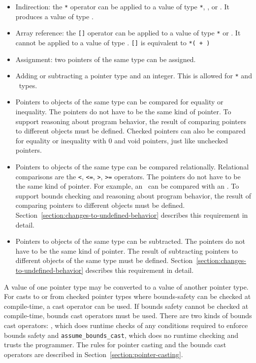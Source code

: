\begin{itemize}
\item
  Indirection: the \texttt{*} operator can be applied to a value of type
   \texttt{*}, \ptrT, or \arrayptrT. It produces a value of type .
\item
  Array reference: the \texttt{[]} operator can be applied to a
  value of type  \texttt{*} or \arrayptrT. It
  cannot be applied to a value of type \ptrT.
  \texttt{[]} is equivalent to
  \texttt{*( + )}
\item
  Assignment: two pointers of the same type can be assigned.
\item
  Adding or subtracting a pointer type and an integer. This is allowed
  for  \texttt{*} and \arrayptrT\ types.
\item
  Pointers to objects of the same type can be compared for equality or
  inequality. The pointers do not have to be the same kind of pointer.
  To support reasoning about program behavior, the result of comparing
  pointers to different objects must be defined.  Checked pointers can also
  be compared for equality or inequality with 0 and void pointers, 
  just like unchecked pointers.
\item
  Pointers to objects of the same type can be compared relationally. Relational comparisons are the
  \verb|<|, \verb|<=|, \verb|>|, \verb|>=| operators. The pointers do not have to be
  the same kind of pointer. For example, an \uncheckedptrT\ can be compared with an
  \arrayptrT . To support bounds checking and reasoning about program behavior, the
  result of comparing pointers to different objects must be defined.
  Section~\ref{section:changes-to-undefined-behavior} describes this requirement in detail.
\item
  Pointers to objects of the same type can be subtracted. The pointers do not have to be
  the same kind of
  pointer. The result of subtracting pointers to different objects of
  the same type must be defined. Section~\ref{section:changes-to-undefined-behavior}
  describes this requirement in detail.
\end{itemize}

A value of one pointer type may be converted to a value of another
pointer type. For casts to or from checked pointer types where
bounds-safety can be checked at compile-time, a cast operator can be
used. If bounds safety cannot be checked at compile-time, bounds cast
operators must be used. There are two kinds of bounds cast operators:
, which does runtime checks of any
conditions required to enforce bounds safety and
\texttt{assume\_bounds\_cast}, which does no runtime checking and
trusts the programmer. The rules for pointer casting and the bounds cast
operators are described in Section~\ref{section:pointer-casting}.

